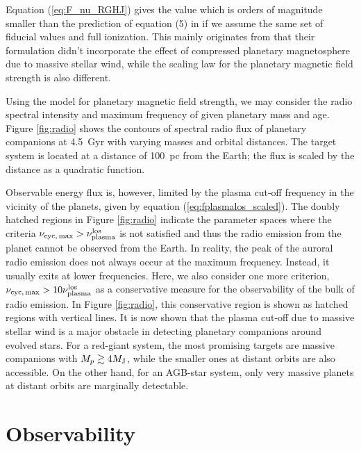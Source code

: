 \documentclass[iop,numberedappendix,apj]{emulateapj}
\begin{document}
Equation (\ref{eq:F_nu_RGHJ}) gives the value which is orders of magnitude smaller than the prediction of equation (5) in \citet{ignace2010} if we assume the same set of fiducial values and full ionization. This mainly originates from that their formulation didn't incorporate the effect of compressed planetary magnetosphere due to massive stellar wind, while the scaling law for the planetary magnetic field strength is also different. 

Using the model for planetary magnetic field strength, we may consider the  radio spectral intensity and maximum frequency of given planetary mass and age. 
Figure \ref{fig:radio} shows the contours of spectral radio flux of planetary companions at 4.5~Gyr with varying masses and orbital distances. 
The target system is located at a distance of 100~pc from the Earth; the flux is scaled by the distance as a quadratic function. 

Observable energy flux is, however, limited by the plasma cut-off frequency in the vicinity of the planets, given by equation (\ref{eq:fplasmalos_scaled}). 
The doubly hatched regions in Figure \ref{fig:radio} indicate the parameter spaces where the criteria $\nu_{\rm cyc,\,max} > \nu_{\rm plasma}^{\rm los}$ is not satisfied and thus the radio emission from the planet cannot be observed from the Earth. 
In reality, the peak of the auroral radio emission does not always occur at the maximum frequency.
Instead, it usually exits at lower frequencies.
Here, we also consider one more criterion, $\nu_{\rm cyc,\,max} > 10 \nu_{\rm plasma}^{\rm los}$ as a conservative measure for the observability of the bulk of radio emission.
In Figure \ref{fig:radio}, this conservative region is shown as hatched regions with vertical lines. 
It is now shown that the plasma cut-off due to massive stellar wind is a major obstacle in detecting planetary companions around evolved stars. 
For a red-giant system, the most promising targets are massive companions with $M_p \gtrsim 4M_{\rm J}$, while the smaller ones at distant orbits are also accessible.  
On the other hand, for an AGB-star system, only very massive planets at distant orbits are marginally detectable. 


\section{Observability}
\label{s:observability}
\end{document}
